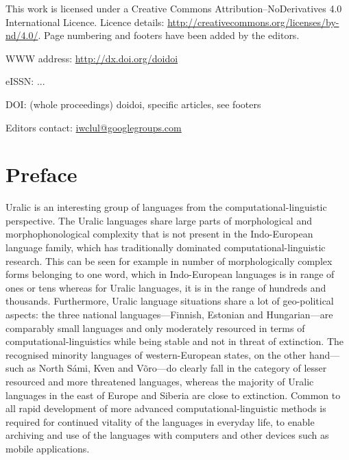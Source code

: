 \documentclass[b5paper]{book}
\newcommand\thedoi{doidoi}
\begin{document}
\frontmatter

\cleardoublepage
\thispagestyle{empty}
{\centering{}}

This work is licensed under a Creative Commons Attribution–NoDerivatives
4.0 International Licence.  Licence details:
\url{http://creativecommons.org/licenses/by-nd/4.0/}. Page numbering and
footers have been added by the editors.

WWW address: \url{http://dx.doi.org/\thedoi}

eISSN: ...

DOI: (whole proceedings) \thedoi, specific articles, see footers

Editors contact: \url{iwclul@googlegroups.com}

\clearpage

\renewcommand\thedoi{doidoi}

\pagestyle{fancy}

\chapter*{Preface}

Uralic is an interesting group of languages from the
computational\hyp{}linguistic perspective.  The Uralic languages share large
parts of morphological and morphophonological complexity that is not present in
the Indo-European language family, which has traditionally dominated
computational-linguistic research.  This can be seen for example in number of
morphologically complex forms belonging to one word, which in Indo-European
languages is in range of ones or tens whereas for Uralic languages, it is in the
range of hundreds and thousands.  Furthermore, Uralic language situations share
a lot of geo-political aspects: the three national languages---Finnish, Estonian
and Hungarian---are comparably small languages and only moderately resourced in
terms of computational-linguistics while being stable and not in threat of
extinction. The recognised minority languages of western-European states, on the
other hand---such as North Sámi, Kven and Võro---do clearly fall in the category
of lesser resourced and more threatened languages, whereas the majority of
Uralic languages in the east of Europe and Siberia are close to extinction.
Common to all rapid development of more advanced computational-linguistic
methods is required for continued vitality of the languages in everyday life, to
enable archiving and use of the languages with computers and other devices such
as mobile applications.
\end{document}
